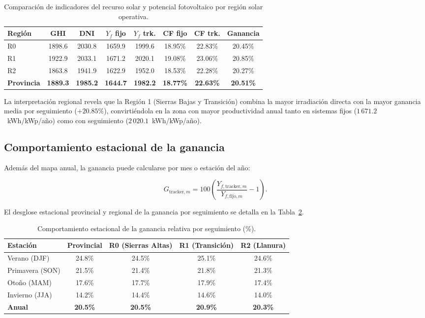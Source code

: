 \documentclass[11pt,a4paper]{article}
\begin{document}
\begin{table}[htbp]
\centering
\small
\caption{Comparación de indicadores del recurso solar y potencial fotovoltaico por región solar operativa.}
\label{tab:ghi_region}
\begin{tabular}{lccccccc}
\toprule
Región & GHI & DNI & $Y_f$ fijo & $Y_f$ trk. & CF fijo & CF trk. & Ganancia \\
\midrule
R0 & 1898.6 & 2030.8 & 1659.9 & 1999.6 & 18.95\% & 22.83\% & 20.45\% \\
R1 & 1922.9 & 2033.1 & 1671.2 & 2020.1 & 19.08\% & 23.06\% & 20.85\% \\
R2 & 1863.8 & 1941.9 & 1622.9 & 1952.0 & 18.53\% & 22.28\% & 20.27\% \\
\midrule
\textbf{Provincia} & \textbf{1889.3} & \textbf{1985.2} & \textbf{1644.7} & \textbf{1982.2} & \textbf{18.77\%} & \textbf{22.63\%} & \textbf{20.51\%} \\
\bottomrule
\end{tabular}
\end{table}

La interpretación regional revela que la Región 1 (Sierras Bajas y Transición) combina la mayor irradiación directa con la mayor ganancia media por seguimiento ($+20.85\%$), convirtiéndola en la zona con mayor productividad anual tanto en sistemas fijos ($1\,671.2$~kWh/kWp/año) como con seguimiento ($2\,020.1$~kWh/kWp/año).

\subsection{Comportamiento estacional de la ganancia}

Además del mapa anual, la ganancia puede calcularse por mes o estación del año:

\[
G_{\mathrm{tracker},m}
=
100
\left(
\frac{Y_{f,\mathrm{tracker},m}}
{Y_{f,\mathrm{fijo},m}}
-1
\right).
\]

El desglose estacional provincial y regional de la ganancia por seguimiento se detalla en la Tabla~\ref{tab:ganancia_estacional}.

\begin{table}[htbp]
\centering
\small
\caption{Comportamiento estacional de la ganancia relativa por seguimiento (\%).}
\label{tab:ganancia_estacional}
\begin{tabular}{lcccc}
\toprule
Estación & Provincial & R0 (Sierras Altas) & R1 (Transición) & R2 (Llanura) \\
\midrule
Verano (DJF) & 24.8\% & 24.5\% & 25.1\% & 24.6\% \\
Primavera (SON) & 21.5\% & 21.4\% & 21.8\% & 21.3\% \\
Otoño (MAM) & 17.6\% & 17.7\% & 17.9\% & 17.4\% \\
Invierno (JJA) & 14.2\% & 14.4\% & 14.6\% & 14.0\% \\
\midrule
\textbf{Anual} & \textbf{20.5\%} & \textbf{20.5\%} & \textbf{20.9\%} & \textbf{20.3\%} \\
\bottomrule
\end{tabular}
\end{table}
\end{document}
